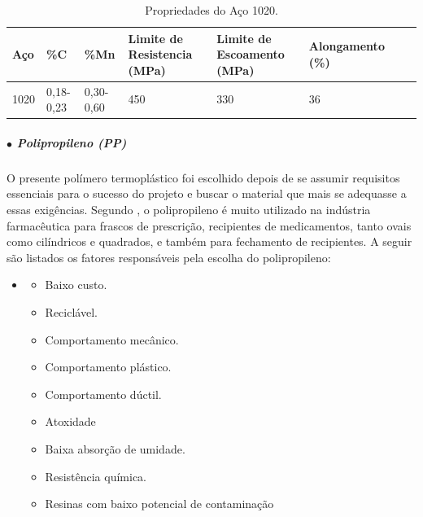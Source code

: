 \begin{table}[H]
    \centering
    \caption{Propriedades do Aço 1020.}
    \label{tab:PropA1020}
    \begin{adjustbox}{max width = \textwidth}
        \begin{tabular}{|L{2cm}|C{2cm}|C{2cm}|C{2cm}|C{3cm}|C{3cm}|C{2.8cm}|C{2cm}|}
            \hline
            \textbf{Aço } & \textbf{\%C} & \textbf{\%Mn} & \textbf{Limite de Resistencia (MPa)} & \textbf{Limite de Escoamento (MPa)} & \textbf{Alongamento (\%)}\\ \hline
            
              1020 & 0,18-0,23 & 0,30-0,60 & 450  & 330 & 36
             \\ \hline
            
        \end{tabular}
    \end{adjustbox}
\end{table}
\subparagraph*{$\bullet$ Polipropileno (PP)} \hfill

O presente polímero termoplástico foi escolhido depois de se assumir requisitos essenciais para o sucesso do projeto e buscar o material que mais se adequasse a essas exigências. Segundo \cite{PP_Recycle}, o polipropileno é muito utilizado na indústria farmacêutica para frascos de prescriç{\~a}o, recipientes de medicamentos, tanto ovais como cilíndricos e quadrados, e também para fechamento de recipientes. A seguir são listados os fatores responsáveis pela escolha do polipropileno: 

\begin{itemize}
    \item[ ]
    \begin{itemize}
        \item Baixo custo.
        \item Reciclável.
        \item Comportamento mecânico. 
        \item Comportamento plástico.
        \item Comportamento dúctil.
        \item Atoxidade
        \item Baixa absorção de umidade.
        \item Resistência química.
        \item Resinas com baixo potencial de contaminação
    \end{itemize}
\end{itemize}

